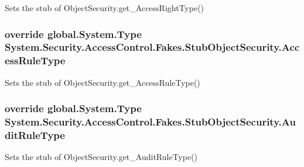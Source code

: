 Sets the stub of Object\-Security.\-get\-\_\-\-Access\-Right\-Type()

\hypertarget{class_system_1_1_security_1_1_access_control_1_1_fakes_1_1_stub_object_security_ad8d5c101cb828a95bc31f3dbe4eaa64c}{
\subsubsection[{Access\-Rule\-Type}]{\setlength{\rightskip}{0pt plus 5cm}override global.\-System.\-Type System.\-Security.\-Access\-Control.\-Fakes.\-Stub\-Object\-Security.\-Access\-Rule\-Type\hspace{0.3cm}{\ttfamily [get]}}}\label{class_system_1_1_security_1_1_access_control_1_1_fakes_1_1_stub_object_security_ad8d5c101cb828a95bc31f3dbe4eaa64c}


Sets the stub of Object\-Security.\-get\-\_\-\-Access\-Rule\-Type()

\hypertarget{class_system_1_1_security_1_1_access_control_1_1_fakes_1_1_stub_object_security_afa1128bea6beb38d9b2c6343263b46b2}{
\subsubsection[{Audit\-Rule\-Type}]{\setlength{\rightskip}{0pt plus 5cm}override global.\-System.\-Type System.\-Security.\-Access\-Control.\-Fakes.\-Stub\-Object\-Security.\-Audit\-Rule\-Type\hspace{0.3cm}{\ttfamily [get]}}}\label{class_system_1_1_security_1_1_access_control_1_1_fakes_1_1_stub_object_security_afa1128bea6beb38d9b2c6343263b46b2}


Sets the stub of Object\-Security.\-get\-\_\-\-Audit\-Rule\-Type()

